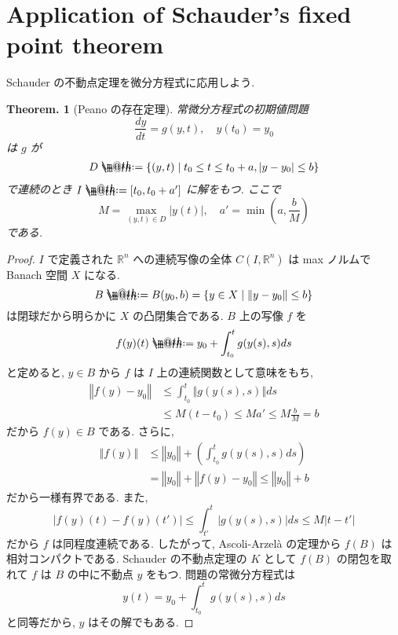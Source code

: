 \documentclass[openany, a4paper, oneside]{jsbook}
\makeatletter
\newcommand*{\defeq}{\mathrel{\rlap{%
\raisebox{0.3ex}{$\m@th\cdot$}}%
\raisebox{-0.3ex}{$\m@th\cdot$}}%
=}
\theoremstyle{break}
\newtheorem{thm}{Theorem.}[section]
\theoremstyle{breakdefn}
\newcommand{\abs}[1]{\left|#1\right|}
\newcommand{\norm}[1]{\left\Vert#1\right\Vert}
\newcommand{\rbk}[1]{\left (#1\right)}
\newcommand{\relmiddle}[1]{\mathrel{}\middle#1\mathrel{}}
\newcommand{\set}[2]{\left\{#1 \relmiddle| #2\right\}}
\newcommand{\bbRn}{\mathbb{R}^n}
\makeatother
\begin{document}
\section{Application of Schauder's fixed point theorem}


Schauder の不動点定理を微分方程式に応用しよう.
\begin{thm}[Peano の存在定理]
常微分方程式の初期値問題
\begin{equation}
 \frac{dy}{dt}
 =
 g (y, t), \quad y(t_0) =y_0
\end{equation}
は $g$ が
\begin{align}
 D
 \defeq
 \set{(y, t)}{t_0 \le t \le t_0 + a, |y - y_0| \le b}
\end{align}
で連続のとき $I \defeq [t_0, t_0 + a']$ に解をもつ.
ここで
\begin{equation}
 M = \max_{(y, t) \in D} |y (t)|, \quad a' = \min \rbk{a, \frac{b}{M}}
\end{equation}
である.
\end{thm}
\begin{proof}
$I$ で定義された $\bbRn$ への連続写像の全体 $C (I, \mathbb{R}^n)$ は max ノルムで Banach 空間 $X$ になる.
\begin{equation}
 B
 \defeq
 B (y_0, b)
 =
 \set{y \in X}{\norm{y - y_0} \le b }
\end{equation}
は閉球だから明らかに $X$ の凸閉集合である.
$B$ 上の写像 $f$ を
\begin{equation}
 f(y) (t)
 \defeq
 y_0 + \int_{t_0}^t g (y (s), s) ds
\end{equation}
と定めると, $y \in B$ から $f$ は $I$ 上の連続関数として意味をもち,
\begin{align}
 \norm{f (y) - y_0}
 &\le
 \int_{t_0}^t \norm{g (y (s), s)} ds \\
 &\le
 M (t - t_0)
 \le
 Ma'
 \le
 M\frac{b}{M}
 =
 b
\end{align}
だから $f (y) \in B$ である.
さらに,
\begin{align}
 \norm{f (y)}
 &\le
 \norm{y_0} + \rbk{\int_{t_0}^t g (y (s),s) ds} \\
 &=
 \norm{y_0} + \norm{f (y) - y_0}
 \le
 \norm{y_0} + b
\end{align}
だから一様有界である.
また,
\begin{equation}
 \abs{f (y) (t) - f (y) (t')}
 \le
 \int_{t'}^t \abs{g (y (s), s)} ds
 \le
 M \abs{t - t'}
\end{equation}
だから $f$ は同程度連続である.
したがって, Ascoli-Arzel\`a の定理から $f (B)$ は相対コンパクトである.
Schauder の不動点定理の $K$ として $f (B)$ の閉包を取れて $f$ は $B$ の中に不動点 $y$ をもつ.
問題の常微分方程式は
\begin{equation}
 y (t)
 =
 y_0 + \int_{t_0}^t g (y (s), s) ds
\end{equation}
と同等だから, $y$ はその解でもある.
\end{proof}
\end{document}
